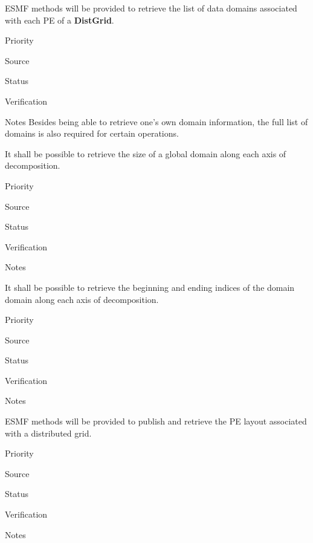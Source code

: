 
ESMF methods will be provided to retrieve the list of data
domains associated with each PE of a  \textbf{DistGrid}.

\begin{reqlist}
\item[Priority]
\item[Source]
\item[Status]
\item[Verification]
\item[Notes] Besides being able to retrieve one's own domain
  information, the full list of domains is also required for certain
  operations.
\end{reqlist}



It shall be possible to retrieve the size of a global domain
along each axis of decomposition.

\begin{reqlist}
\item[Priority]
\item[Source]
\item[Status]
\item[Verification]
\item[Notes]
\end{reqlist}


It shall be possible to retrieve the beginning and ending indices of the
domain domain along each axis of decomposition.

\begin{reqlist}
\item[Priority]
\item[Source]
\item[Status]
\item[Verification]
\item[Notes]
\end{reqlist}


ESMF methods will be provided to publish and retrieve the PE layout
associated with a distributed grid.

\begin{reqlist}
\item[Priority]
\item[Source]
\item[Status]
\item[Verification]
\item[Notes]
\end{reqlist}

